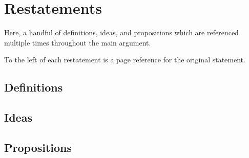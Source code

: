 \chapter{Restatements}
\label{cha:re}

\reversemarginpar

\begin{note}
  Here, a handful of definitions, ideas, and propositions which are referenced multiple times throughout the main argument.

  To the left of each restatement is a page reference for the original statement.
\end{note}

\section{Definitions}
\label{sec:definitions}





\section{Ideas}
\label{sec:ideas}




\section{Propositions}
\label{sec:propositions}






